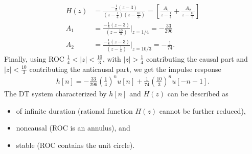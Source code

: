 \documentclass{report}
\begin{document}
\begin{solution}
\begin{align*}
        H(z) &= \frac{-\frac{1}{8}(z-3)}{(z-\frac{1}{4})(z-\frac{10}{3})} = \left[\frac{A_1}{z-\frac{1}{4}} + \frac{A_2}{z-\frac{10}{3}}\right] \\
        A_1 &= \frac{-\frac{1}{8}(z-3)}{(z-\frac{10}{3})}\bigg|_{z=1/4} = -\frac{33}{296} \\
        A_2 &= \frac{-\frac{1}{8}(z-3)}{(z-\frac{1}{4})}\bigg|_{z=10/3} = -\frac{1}{74}.
    \end{align*}
    Finally, using ROC $\frac{1}{4}<|z|<\frac{10}{3}$, with $|z|>\frac{1}{4}$ contributing the causal part and $|z|<\frac{10}{3}$ contributing the anticausal part, we get the impulse response 
    \begin{align*}
        h[n] = -\frac{33}{296}\left(\frac{1}{4}\right)^n u[n] + \frac{1}{74}\left(\frac{10}{3}\right)^n u[-n-1].
    \end{align*}
    The DT system characterized by $h[n]$ and $H(z)$ can be described as 
    \begin{itemize}
        \item of infinite duration (rational function $H(z)$ cannot be further reduced), 
        \item noncausal (ROC is an annulus), and
        \item stable (ROC contains the unit circle).
    \end{itemize}
\end{solution}
\end{document}
